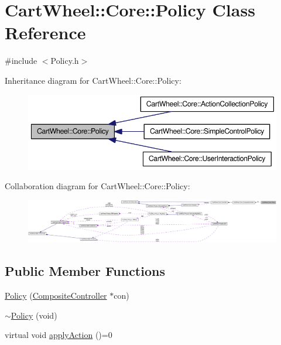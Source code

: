\hypertarget{classCartWheel_1_1Core_1_1Policy}{
\section{CartWheel::Core::Policy Class Reference}
\label{classCartWheel_1_1Core_1_1Policy}
}


{\ttfamily \#include $<$Policy.h$>$}



Inheritance diagram for CartWheel::Core::Policy:\nopagebreak
\begin{figure}[H]
\begin{center}
\leavevmode
\includegraphics[width=380pt]{classCartWheel_1_1Core_1_1Policy__inherit__graph}
\end{center}
\end{figure}


Collaboration diagram for CartWheel::Core::Policy:\nopagebreak
\begin{figure}[H]
\begin{center}
\leavevmode
\includegraphics[width=400pt]{classCartWheel_1_1Core_1_1Policy__coll__graph}
\end{center}
\end{figure}
\subsection*{Public Member Functions}
\begin{DoxyCompactItemize}
\item 
\hyperlink{classCartWheel_1_1Core_1_1Policy_a107d03cb892f75995a9f0875c04e4be3}{Policy} (\hyperlink{classCartWheel_1_1Core_1_1CompositeController}{CompositeController} $\ast$con)
\item 
\hyperlink{classCartWheel_1_1Core_1_1Policy_a5ce4b4b64a0923faea34a4416b40c40e}{$\sim$Policy} (void)
\item 
virtual void \hyperlink{classCartWheel_1_1Core_1_1Policy_acccd1ec26392309eff12c565ae9fb8c7}{applyAction} ()=0
\end{DoxyCompactItemize}

